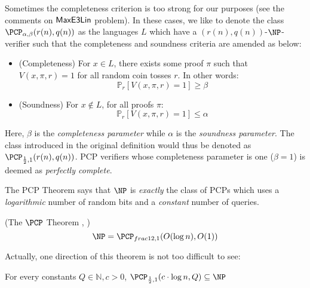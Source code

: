 \begin{remark}
  Sometimes the completeness criterion is too strong for our purposes (see the comments on $\mathsf{MaxE3Lin}$ problem). In these cases, we like to denote the class $\PCP_{\alpha, \beta }(r(n),q(n))$ as the languages $L$ which have a $(r(n),q(n))$-$\NP$-verifier such that the completeness and soundness criteria are amended as below: \newline

  \begin{itemize}
    \item (Completeness) For $x \in L$, there exists some proof $\pi$ such that $V(x,\pi,r) = 1$ for all random coin tosses $r$. In other words:
    \begin{equation}
      \mathbb{P}_{r}[V(x,\pi,r) = 1] \geq \beta
    \end{equation}

    \item (Soundness) For $x \not\in L$, for all proofs $\pi$:
    \begin{equation}
      \mathbb{P}_{r}[V(x,\pi,r) = 1] \leq \alpha
    \end{equation}
  \end{itemize}
Here, $\beta$ is the \emph{completeness parameter} while $\alpha$ is the \emph{soundness parameter}. The class introduced in the original definition would thus be denoted as $\PCP_{\frac{1}{2},1}(r(n),q(n))$. PCP verifiers whose completeness parameter is one ($\beta = 1$) is deemed as \emph{perfectly complete}.
\end{remark}

The PCP Theorem says that $\NP$ is \emph{exactly} the class of PCPs which uses a \emph{logarithmic} number of random bits and a \emph{constant} number of queries.
%
\begin{theorem} \label{pcptheorem} (The $\PCP$ Theorem \cite{arora1998proof}, \cite{arora1998probabilistic})
%
\begin{equation}
\NP = \PCP_{frac{1}{2},1}(O(\log{n}), O(1))
\end{equation}
\end{theorem}

Actually, one direction of this theorem is not too difficult to see:

\begin{proposition}
For every constants $Q \in \mathbb{N}, c > 0$, $\PCP_{\frac{1}{2}, 1}(c\cdot\log{n}, Q) \subseteq \NP$
\end{proposition}

